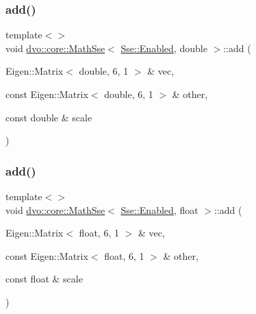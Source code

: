 \mbox{\label{classdvo_1_1core_1_1_math_sse_a569d441b55c932cf1220a93ef5f155f3}} 
\subsubsection{\texorpdfstring{add()}{add()}\hspace{0.1cm}{\footnotesize\ttfamily [3/5]}}
{\footnotesize\ttfamily template$<$$>$ \\
void \mbox{\hyperlink{classdvo_1_1core_1_1_math_sse}{dvo\+::core\+::\+Math\+Sse}}$<$ \mbox{\hyperlink{structdvo_1_1core_1_1_sse_a4fd9b55a1ec035f837cc78f33d45a9adadefbacd4d80d2e8ba64c1583a4fda95a}{Sse\+::\+Enabled}}, double $>$\+::add (\begin{DoxyParamCaption}\item[{Eigen\+::\+Matrix$<$ double, 6, 1 $>$ \&}]{vec,  }\item[{const Eigen\+::\+Matrix$<$ double, 6, 1 $>$ \&}]{other,  }\item[{const double \&}]{scale }\end{DoxyParamCaption})}

\mbox{\label{classdvo_1_1core_1_1_math_sse_a942e37dc174d6ed03a48fcb9e9b53b88}} 
\subsubsection{\texorpdfstring{add()}{add()}\hspace{0.1cm}{\footnotesize\ttfamily [4/5]}}
{\footnotesize\ttfamily template$<$$>$ \\
void \mbox{\hyperlink{classdvo_1_1core_1_1_math_sse}{dvo\+::core\+::\+Math\+Sse}}$<$ \mbox{\hyperlink{structdvo_1_1core_1_1_sse_a4fd9b55a1ec035f837cc78f33d45a9adadefbacd4d80d2e8ba64c1583a4fda95a}{Sse\+::\+Enabled}}, float $>$\+::add (\begin{DoxyParamCaption}\item[{Eigen\+::\+Matrix$<$ float, 6, 1 $>$ \&}]{vec,  }\item[{const Eigen\+::\+Matrix$<$ float, 6, 1 $>$ \&}]{other,  }\item[{const float \&}]{scale }\end{DoxyParamCaption})}

